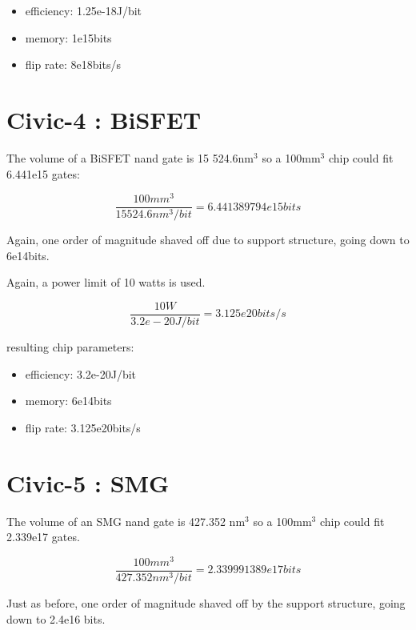 \documentclass[a4paper]{article}
\begin{document}
	\begin{itemize}
		\item efficiency: 1.25e-18J/bit
		
		\item memory: 1e15bits
		
		\item flip rate: 8e18bits/s
	\end{itemize}
	
	\pagebreak
	
	\section{Civic-4 : 	BiSFET}
	
	The volume of a BiSFET nand gate is 15 524.6nm$^3$ so a 100mm$^3$ chip could fit 6.441e15 gates:
	
	$$ \frac{100mm^3}{15 524.6nm^3/bit} = 6.441389794e15 bits $$
	
	Again, one order of magnitude shaved off due to support structure, going down to 6e14bits.
	
	\medskip
	
	Again, a power limit of 10 watts is used.
	
	$$ \frac{10W}{3.2e-20J/bit} = 3.125e20bits/s$$
	
	resulting chip parameters:
	
	\begin{itemize}
		\item efficiency: 3.2e-20J/bit
		
		\item memory: 6e14bits
		
		\item flip rate: 3.125e20bits/s
	\end{itemize}
	
	\section{Civic-5 : SMG}
	
	The volume of an SMG nand gate is 427.352 nm$^3$ so a 100mm$^3$ chip could fit 2.339e17 gates.
	
	$$ \frac{100mm^3}{427.352nm^3/bit} = 2.339991389e17 bits $$
	
	\noindent Just as before, one order of magnitude shaved off by the support structure, going down to 2.4e16 bits.
	
\end{document}
